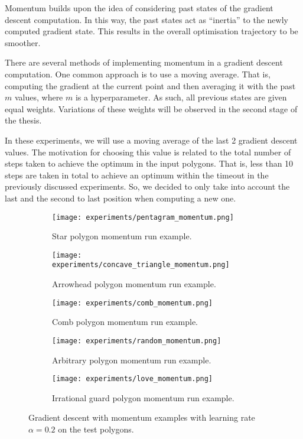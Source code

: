 Momentum \cite{goodfelow2016deep} builds upon the idea of considering past states of the gradient descent computation. In this way, the past states act as ``inertia'' to the newly computed gradient state. This results in the overall optimisation trajectory to be smoother. 

There are several methods of implementing momentum in a gradient descent computation. One common approach is to use a moving average. That is, computing the gradient at the current point and then averaging it with the past $m$ values, where $m$ is a hyperparameter. As such, all previous states are given equal weights. Variations of these weights will be observed in the second stage of the thesis.

In these experiments, we will use a moving average of the last 2 gradient descent values. The motivation for choosing this value is related to the total number of steps taken to achieve the optimum in the input polygons. That is, less than 10 steps are taken in total to achieve an optimum within the timeout in the previously discussed experiments. So, we decided to only take into account the last and the second to last position when computing a new one.

\begin{figure}[h!]
    \centering
    \begin{subfigure}{0.45\textwidth}
        \centering
        \texttt{[image: experiments/pentagram\_momentum.png]}
        \caption{Star polygon momentum run example.}
        \label{fig:star_momentum}
    \end{subfigure}
    \begin{subfigure}{0.45\textwidth}
        \centering
        \texttt{[image: experiments/concave\_triangle\_momentum.png]}
        \caption{Arrowhead polygon momentum run example.}
        \label{fig:concave_momentum}
    \end{subfigure}
    \begin{subfigure}{0.45\textwidth}
        \centering
        \texttt{[image: experiments/comb\_momentum.png]}
        \caption{Comb polygon momentum run example.}
        \label{fig:comb_momentum}
    \end{subfigure}
    \begin{subfigure}{0.45\textwidth}
        \centering
        \texttt{[image: experiments/random\_momentum.png]}
        \caption{Arbitrary polygon momentum run example.}
        \label{fig:random_momentum}
    \end{subfigure}
    \begin{subfigure}{\textwidth}
        \centering
        \texttt{[image: experiments/love\_momentum.png]}
        \caption{Irrational guard polygon momentum run example.}
        \label{fig:love_momentum}
    \end{subfigure}
    \caption{Gradient descent with momentum examples with learning rate $\alpha = 0.2$ on the test polygons.}
    \label{fig:momentums}
\end{figure}

